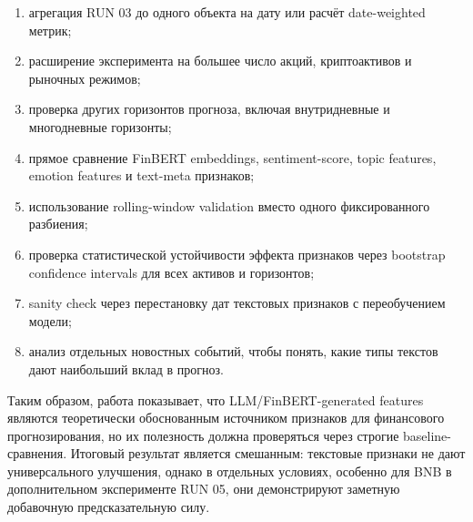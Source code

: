 \begin{enumerate}
    \item агрегация RUN 03 до одного объекта на дату или расчёт date-weighted метрик;
    \item расширение эксперимента на большее число акций, криптоактивов и рыночных режимов;
    \item проверка других горизонтов прогноза, включая внутридневные и многодневные горизонты;
    \item прямое сравнение FinBERT embeddings, sentiment-score, topic features, emotion features и text-meta признаков;
    \item использование rolling-window validation вместо одного фиксированного разбиения;
    \item проверка статистической устойчивости эффекта признаков через bootstrap confidence intervals для всех активов и горизонтов;
    \item sanity check через перестановку дат текстовых признаков с переобучением модели;
    \item анализ отдельных новостных событий, чтобы понять, какие типы текстов дают наибольший вклад в прогноз.
\end{enumerate}

Таким образом, работа показывает, что LLM/FinBERT-generated features являются теоретически обоснованным источником признаков для финансового прогнозирования, но их полезность должна проверяться через строгие baseline-сравнения. Итоговый результат является смешанным: текстовые признаки не дают универсального улучшения, однако в отдельных условиях, особенно для BNB в дополнительном эксперименте RUN 05, они демонстрируют заметную добавочную предсказательную силу.
